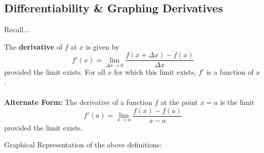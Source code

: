 \subsection*{Differentiability \& Graphing Derivatives}
Recall...
\begin{tcolorbox}[title= DEFINITION OF THE DERIVATIVE OF A FUNCTION,colframe=black,sharp corners,colback=white,colbacktitle=white,coltitle=black,boxrule=1pt]

    The \textbf{derivative} of $f$ at $x$ is given by
    \[f'(x)=\lim_{\Delta x\to0}\frac{f(x+\Delta x)-f(x)}{\Delta x}\]
    provided the limit exists. For all $x$ for which this limit exists, $f'$ is a function of $x$.\\
    \\
    \textbf{Alternate Form:} The derivative of a function $f$ at the point $x=a$ is the limit \[f'(a)=\lim_{x\to a}\frac{f(x)-f(a)}{x-a}\]
    provided the limit exists.
    
\end{tcolorbox}
\vspace{.15cm}
Graphical Representation of the above definitions:

